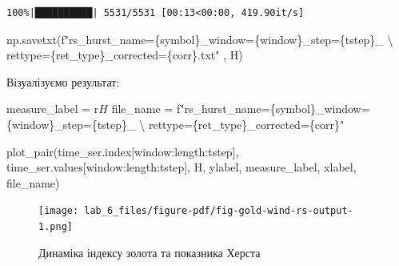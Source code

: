 \documentclass[
  letterpaper,
]{report}
\newenvironment{Shaded}{\begin{snugshade}}{\end{snugshade}}
\newcommand{\CharTok}[1]{\textcolor[rgb]{0.13,0.47,0.30}{#1}}
\newcommand{\NormalTok}[1]{\textcolor[rgb]{0.00,0.23,0.31}{#1}}
\newcommand{\OperatorTok}[1]{\textcolor[rgb]{0.37,0.37,0.37}{#1}}
\newcommand{\SpecialCharTok}[1]{\textcolor[rgb]{0.37,0.37,0.37}{#1}}
\newcommand{\SpecialStringTok}[1]{\textcolor[rgb]{0.13,0.47,0.30}{#1}}
\newcommand{\VerbatimStringTok}[1]{\textcolor[rgb]{0.13,0.47,0.30}{#1}}
\begin{document}
\begin{verbatim}
100%|██████████| 5531/5531 [00:13<00:00, 419.90it/s]
\end{verbatim}

\begin{Shaded}
\begin{Highlighting}[]
\NormalTok{np.savetxt(}\SpecialStringTok{f"rs\_hurst\_name=}\SpecialCharTok{\{}\NormalTok{symbol}\SpecialCharTok{\}}\SpecialStringTok{\_window=}\SpecialCharTok{\{}\NormalTok{window}\SpecialCharTok{\}}\SpecialStringTok{\_step=}\SpecialCharTok{\{}\NormalTok{tstep}\SpecialCharTok{\}}\SpecialStringTok{\_ }\CharTok{\textbackslash{}}
\SpecialStringTok{           rettype=}\SpecialCharTok{\{}\NormalTok{ret\_type}\SpecialCharTok{\}}\SpecialStringTok{\_corrected=}\SpecialCharTok{\{}\NormalTok{corr}\SpecialCharTok{\}}\SpecialStringTok{.txt"}\NormalTok{ , H)}
\end{Highlighting}
\end{Shaded}

Візуалізуємо результат:

\begin{Shaded}
\begin{Highlighting}[]
\NormalTok{measure\_label }\OperatorTok{=} \VerbatimStringTok{r\textquotesingle{}$H$\textquotesingle{}}
\NormalTok{file\_name }\OperatorTok{=} \SpecialStringTok{f"rs\_hurst\_name=}\SpecialCharTok{\{}\NormalTok{symbol}\SpecialCharTok{\}}\SpecialStringTok{\_window=}\SpecialCharTok{\{}\NormalTok{window}\SpecialCharTok{\}}\SpecialStringTok{\_step=}\SpecialCharTok{\{}\NormalTok{tstep}\SpecialCharTok{\}}\SpecialStringTok{\_ }\CharTok{\textbackslash{}}
\SpecialStringTok{           rettype=}\SpecialCharTok{\{}\NormalTok{ret\_type}\SpecialCharTok{\}}\SpecialStringTok{\_corrected=}\SpecialCharTok{\{}\NormalTok{corr}\SpecialCharTok{\}}\SpecialStringTok{"}
\end{Highlighting}
\end{Shaded}

\begin{Shaded}
\begin{Highlighting}[]
\NormalTok{plot\_pair(time\_ser.index[window:length:tstep],}
\NormalTok{          time\_ser.values[window:length:tstep],}
\NormalTok{          H, }
\NormalTok{          ylabel, }
\NormalTok{          measure\_label,}
\NormalTok{          xlabel,}
\NormalTok{          file\_name)}
\end{Highlighting}
\end{Shaded}

\begin{figure}[H]

{\centering \texttt{[image: lab\_6\_files/figure-pdf/fig-gold-wind-rs-output-1.png]}

}

\caption{\label{fig-gold-wind-rs}Динаміка індексу золота та показника
Херста}

\end{figure}
\end{document}
